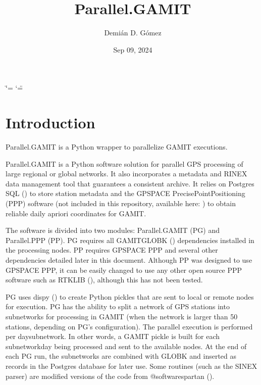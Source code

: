 \documentclass[letterpaper,10pt,english]{sphinxmanual}
\title{Parallel.GAMIT}
\date{Sep 09, 2024}
\author{Demián D.\@{} Gómez}
\begin{document}
\ifdefined\shorthandoff
  \ifnum\catcode`\=\string=\active\shorthandoff{=}\fi
  \ifnum\catcode`\"=\active{}\fi
\fi

\pagestyle{empty}
\sphinxmaketitle
\pagestyle{plain}
\sphinxtableofcontents
\pagestyle{normal}
\label{\detokenize{index::doc}}



\chapter{Introduction}
\label{\detokenize{index:introduction}}
\sphinxAtStartPar
Parallel.GAMIT is a Python wrapper to parallelize GAMIT executions.

\sphinxAtStartPar
Parallel.GAMIT is a Python software solution for parallel GPS processing of large regional or global networks. It also incorporates a metadata and RINEX data management tool that guarantees a consistent archive. It relies on Postgres SQL () to store station metadata and the GPSPACE Precise\sphinxhyphen{}Point\sphinxhyphen{}Positioning (PPP) software (not included in this repository, available here: ) to obtain reliable daily a\sphinxhyphen{}priori coordinates for GAMIT.

\sphinxAtStartPar
The software is divided into two modules: Parallel.GAMIT (PG) and Parallel.PPP (PP). PG requires all GAMIT\sphinxhyphen{}GLOBK () dependencies installed in the processing nodes. PP requires GPSPACE PPP and several other dependencies detailed later in this document. Although PP was designed to use GPSPACE PPP, it can be easily changed to use any other open source PPP software such as RTKLIB (), although this has not been tested.

\sphinxAtStartPar
PG uses dispy () to create Python pickles that are sent to local or remote nodes for execution. PG has the ability to split a network of GPS stations into subnetworks for processing in GAMIT (when the network is larger than 50 stations, depending on PG’s configuration). The parallel execution is performed per day\sphinxhyphen{}subnetwork. In other words, a GAMIT pickle is built for each subnetwork\sphinxhyphen{}day being processed and sent to the available nodes. At the end of each PG run, the subnetworks are combined with GLOBK and inserted as records in the Postgres database for later use. Some routines (such as the SINEX parser) are modified versions of the code from @softwarespartan ().
\end{document}
